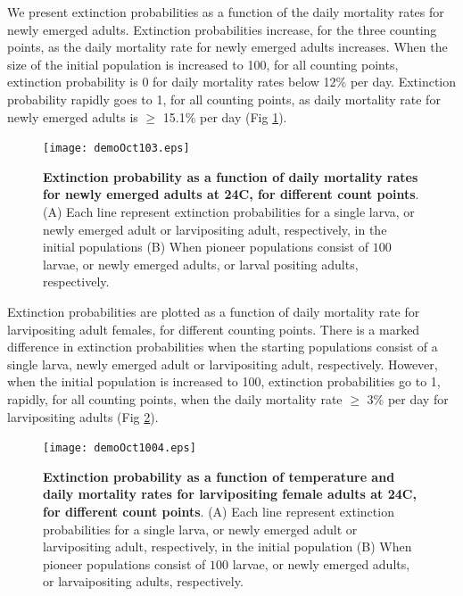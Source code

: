 \documentclass[smallextended]{svjour3}
\begin{document}
We present extinction probabilities as a function of the daily mortality rates for newly emerged adults. Extinction probabilities increase, for the three counting points, as the daily mortality rate for newly emerged adults increases. When the size of the initial population is increased to 100, for all counting points, extinction probability is 0 for daily mortality rates below 12\% per day. Extinction probability rapidly goes to 1, for all counting points, as daily mortality rate for newly emerged adults is $\geq$ 15.1\% per day (Fig \ref{fig:4}).



\begin{figure}[h]
	\texttt{[image: demoOct103.eps]}
	\caption{{\bf Extinction probability as a function of daily mortality rates for newly emerged adults at 24\degree C, for different count points}. (A) Each line represent extinction probabilities for a single larva, or  newly emerged adult or larvipositing adult, respectively,  in the initial populations (B) When pioneer populations consist of  $100$ larvae,  or newly emerged adults, or larval positing adults, respectively.}
	\label{fig:4}       %
\end{figure}
%

\newpage

Extinction probabilities are plotted as a function of daily mortality rate for larvipositing adult females, for different counting points. There is a marked difference in extinction probabilities when the starting populations consist of a single larva, newly emerged adult or larvipositing adult, respectively. However, when the initial population is increased to 100, extinction probabilities go to 1, rapidly, for all counting points, when the daily mortality rate $\geq$ 3\% per day for larvipositing adults (Fig \ref{fig:5}). 



 \begin{figure}[h]
 	\texttt{[image: demoOct1004.eps]}
 	\caption{{\bf Extinction probability as a function of temperature and daily mortality rates for larvipositing female adults at 24\degree C, for different count points}. (A) Each line represent extinction probabilities for a single larva, or  newly emerged adult or larvipositing adult, respectively, in the initial population (B) When pioneer populations consist of  $100$ larvae,  or  newly emerged adults, or larvaipositing adults, respectively.}
 	\label{fig:5}       %
 \end{figure}
\end{document}
